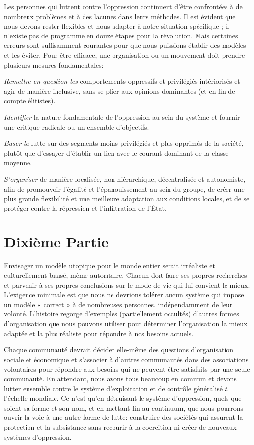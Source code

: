 Les personnes qui luttent contre l'oppression continuent d'être confrontées à de nombreux problèmes et à des lacunes dans leurs méthodes. Il est évident que nous devons rester flexibles et nous adapter à notre situation spécifique ; il n'existe pas de programme en douze étapes pour la révolution. Mais certaines erreurs sont suffisamment courantes pour que nous puissions établir des modèles et les éviter. Pour être efficace, une organisation ou un mouvement doit prendre plusieurs mesures fondamentales:

\emph{Remettre en question les} comportements oppressifs et privilégiés intériorisés et agir de manière inclusive, sans se plier aux opinions dominantes (et en fin de compte élitistes).

\emph{Identifier} la nature fondamentale de l'oppression au sein du système et fournir une critique radicale ou un ensemble d'objectifs.

\emph{Baser la} lutte sur des segments moins privilégiés et plus opprimés de la société, plutôt que d'essayer d'établir un lien avec le courant dominant de la classe moyenne.

\emph{S'organiser} de manière localisée, non hiérarchique, décentralisée et autonomiste, afin de promouvoir l'égalité et l'épanouissement au sein du groupe, de créer une plus grande flexibilité et une meilleure adaptation aux conditions locales, et de se protéger contre la répression et l'infiltration de l'État.

\chapter*{\textbf{Dixième Partie}}

Envisager un modèle utopique pour le monde entier serait irréaliste et culturellement biaisé, même autoritaire. Chacun doit faire ses propres recherches et parvenir à ses propres conclusions sur le mode de vie qui lui convient le mieux. L'exigence minimale est que nous ne devrions tolérer aucun système qui impose un modèle « correct » à de nombreuses personnes, indépendamment de leur volonté. L'histoire regorge d'exemples (partiellement occultés) d'autres formes d'organisation que nous pouvons utiliser pour déterminer l'organisation la mieux adaptée et la plus réaliste pour répondre à nos besoins actuels.

Chaque communauté devrait décider elle-même des questions d'organisation sociale et économique et s'associer à d'autres communautés dans des associations volontaires pour répondre aux besoins qui ne peuvent être satisfaits par une seule communauté. En attendant, nous avons tous beaucoup en commun et devons lutter ensemble contre le système d'exploitation et de contrôle généralisé à l'échelle mondiale. Ce n'est qu'en détruisant le système d'oppression, quels que soient sa forme et son nom, et en mettant fin au continuum, que nous pourrons ouvrir la voie à une autre forme de lutte: construire des sociétés qui assurent la protection et la subsistance sans recourir à la coercition ni créer de nouveaux systèmes d'oppression.

